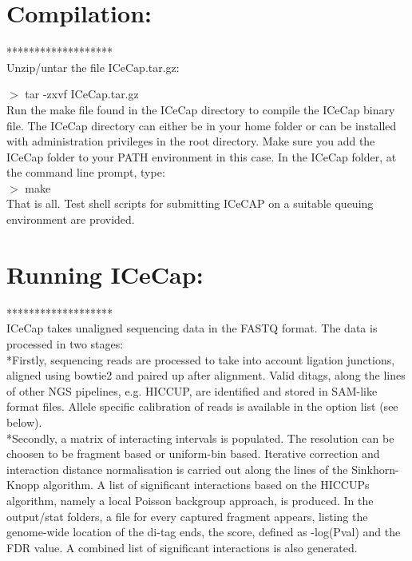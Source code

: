 \documentclass[10pt,a4paper]{article}
\begin{document}
\section{Compilation:}
*******************\\
Unzip/untar the file ICeCap.tar.gz:

$>$ tar -zxvf ICeCap.tar.gz\\
Run the make file found in the ICeCap directory to compile the ICeCap binary file. The ICeCap directory can either be in your home folder or 
can be installed with administration privileges in the root directory.
Make sure you add the ICeCap folder to your PATH environment in this case.
In the ICeCap folder, at the command line prompt, type:\\

$>$ make\\
That is all. Test shell scripts for submitting ICeCAP on a suitable queuing environment are provided.

\vspace*{1cm}

\section{Running ICeCap:}
*******************\\
ICeCap takes unaligned sequencing data in the FASTQ format.  The data is processed in two stages: \\

*Firstly, sequencing reads are processed to take into account ligation junctions, aligned using bowtie2 and paired up after alignment.  Valid ditags, along the lines of other NGS pipelines, e.g. HICCUP,  are identified and stored in SAM-like format files. Allele specific calibration of reads is available in the option list (see below).\\

*Secondly, a matrix of interacting intervals is populated. The resolution can be choosen to be fragment based or uniform-bin based. Iterative correction and interaction distance normalisation is carried out along the lines of the Sinkhorn-Knopp algorithm.  A list of significant interactions based on the HICCUPs algorithm, namely a local Poisson backgroup approach, is produced. In the output/stat folders, a file for every captured fragment appears, listing the genome-wide location of the di-tag ends, the score, defined as -log(Pval) and the FDR value. A combined list of significant interactions is also generated. \\
\end{document}
